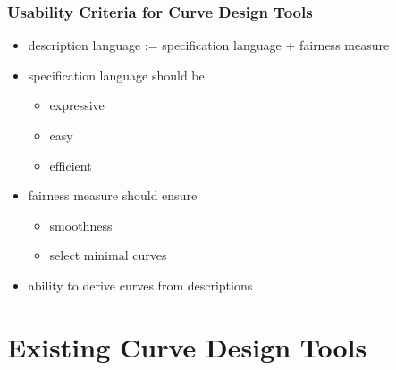 \documentclass[mathserif]{beamer}
\begin{document}
		\begin{frame}
			\frametitle{Usability Criteria for Curve Design Tools}
			\begin{itemize}
				\item description language := specification language + fairness measure
				\item specification language should be
				\begin{itemize}
					\item expressive
					\item easy
					\item efficient
				\end{itemize}
				\item fairness measure should ensure
				\begin{itemize}
					\item smoothness
					\item select minimal curves
				\end{itemize}
				\item ability to derive curves from descriptions
			\end{itemize}
		\end{frame}
		
	\section{Existing Curve Design Tools}
	
\end{document}
